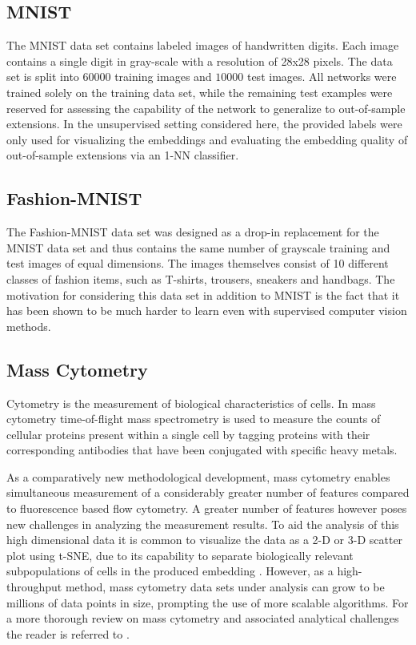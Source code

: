 \subsection{MNIST}
\label{subsubsection:mnist}

The MNIST data set \citep{mnist} contains labeled images of handwritten digits. Each image contains a single digit in gray-scale with a resolution of 28x28 pixels. The data set is split into $60000$ training images and $10000$ test images. All networks were trained solely on the training data set, while the remaining test examples were reserved for assessing the capability of the network to generalize to out-of-sample extensions. In the unsupervised setting considered here, the provided labels were only used for visualizing the embeddings and evaluating the embedding quality of out-of-sample extensions via an 1-NN classifier.

\subsection{Fashion-MNIST}
\label{subsubsection:fashion_mnist}

The Fashion-MNIST data set \cite{fashion_mnist} was designed as a drop-in replacement for the MNIST data set and thus contains the same number of grayscale training and test images of equal dimensions. The images themselves consist of 10 different classes of fashion items, such as T-shirts, trousers, sneakers and handbags. The motivation for considering this data set in addition to MNIST is the fact that it has been shown to be much harder to learn even with supervised computer vision methods.

\subsection{Mass Cytometry}
\label{subsubsection:mass_cytometry}

Cytometry is the measurement of biological characteristics of cells. In mass cytometry time-of-flight mass spectrometry is used to measure the counts of cellular proteins present within a single cell by tagging proteins with their corresponding antibodies that have been conjugated with specific heavy metals.

As a comparatively new methodological development, mass cytometry enables simultaneous measurement of a considerably greater number of features compared to fluorescence based flow cytometry. A greater number of features however poses new challenges in analyzing the measurement results. To aid the analysis of this high dimensional data it is common to visualize the data as a 2-D or 3-D scatter plot using t-SNE, due to its capability to separate biologically relevant subpopulations of cells in the produced embedding \citep{visne}. However, as a high-throughput method, mass cytometry data sets under analysis can grow to be millions of data points in size, prompting the use of more scalable algorithms. For a more thorough review on mass cytometry and associated analytical challenges the reader is referred to \cite{mass_cytometry}.

